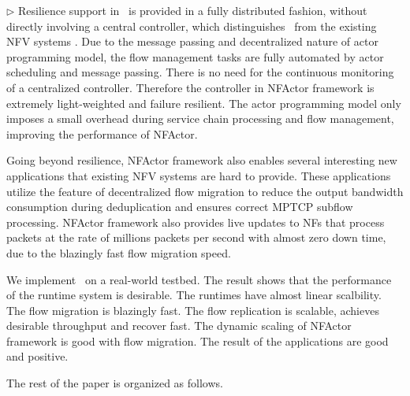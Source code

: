 $\triangleright$ Resilience support in \nfactor~is provided in a fully distributed fashion, without directly involving a central controller, which distinguishes \nfactor~from the existing NFV systems \cite{gember2015opennf}. Due to the message passing and decentralized nature of actor programming model, the flow management tasks are fully automated by actor scheduling and message passing. There is no need for the continuous monitoring of a centralized controller. Therefore the controller in NFActor framework is extremely light-weighted and failure resilient. The actor programming model only imposes a small overhead during service chain processing and flow management, improving the performance of NFActor.

Going beyond resilience, NFActor framework also enables several interesting new applications that existing NFV systems are hard to provide. These applications utilize the feature of decentralized flow migration to reduce the output bandwidth consumption during deduplication and ensures correct MPTCP subflow processing. NFActor framework also provides live updates to NFs that process packets at the rate of millions packets per second with almost zero down time, due to the blazingly fast flow migration speed.

We implement \nfactor~on a real-world testbed.  The result shows that the performance of the runtime system is desirable. The runtimes have almost linear scalbility. The flow migration is blazingly fast. The flow replication is scalable, achieves desirable throughput and recover fast. The dynamic scaling of NFActor framework is good with flow migration. The result of the applications are good and positive.

 
The rest of the paper is organized as follows.  %







